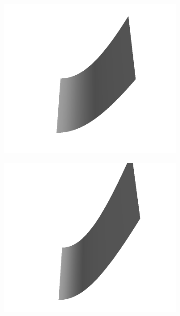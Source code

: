\documentclass[../document.tex]{subfiles}
\begin{document}
\begin{figure}[htbp]
\begin{subfigure}[b]{0.24\textwidth}
    \includegraphics[width=\linewidth]{../img/5/custom_patches/ramp/all/14-3d.png}
    \end{subfigure}
    \begin{subfigure}[b]{0.24\textwidth}
    \includegraphics[width=\linewidth]{../img/5/custom_patches/ramp/all/17-3d.png}
    \end{subfigure}
    \begin{subfigure}[b]{0.24\textwidth}

\end{subfigure}
\end{figure}
\end{document}
